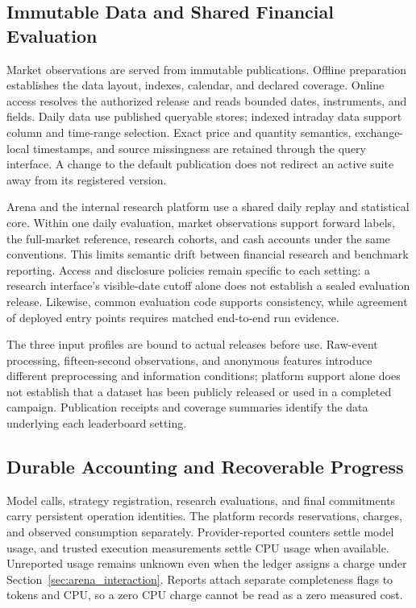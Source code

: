 \subsection{Immutable Data and Shared Financial Evaluation}
\label{sec:arena_data}

Market observations are served from immutable publications. Offline preparation establishes the data layout, indexes, calendar, and declared coverage. Online access resolves the authorized release and reads bounded dates, instruments, and fields. Daily data use published queryable stores; indexed intraday data support column and time-range selection. Exact price and quantity semantics, exchange-local timestamps, and source missingness are retained through the query interface. A change to the default publication does not redirect an active suite away from its registered version.

Arena and the internal research platform use a shared daily replay and statistical core. Within one daily evaluation, market observations support forward labels, the full-market reference, research cohorts, and cash accounts under the same conventions. This limits semantic drift between financial research and benchmark reporting. Access and disclosure policies remain specific to each setting: a research interface's visible-date cutoff alone does not establish a sealed evaluation release. Likewise, common evaluation code supports consistency, while agreement of deployed entry points requires matched end-to-end run evidence.

The three input profiles are bound to actual releases before use. Raw-event processing, fifteen-second observations, and anonymous features introduce different preprocessing and information conditions; platform support alone does not establish that a dataset has been publicly released or used in a completed campaign. Publication receipts and coverage summaries identify the data underlying each leaderboard setting.

\subsection{Durable Accounting and Recoverable Progress}
\label{sec:arena_recovery}

Model calls, strategy registration, research evaluations, and final commitments carry persistent operation identities. The platform records reservations, charges, and observed consumption separately. Provider-reported counters settle model usage, and trusted execution measurements settle CPU usage when available. Unreported usage remains unknown even when the ledger assigns a charge under Section~\ref{sec:arena_interaction}. Reports attach separate completeness flags to tokens and CPU, so a zero CPU charge cannot be read as a zero measured cost.

